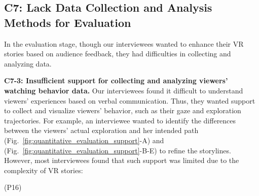 \subsection{C7: Lack Data Collection and Analysis Methods for Evaluation}

In the evaluation stage, though our interviewees wanted to enhance their VR stories based on audience feedback, they had difficulties in collecting and analyzing data.

\textbf{C7-3: Insufficient support for collecting and analyzing viewers’ watching behavior data.}
Our interviewees found it difficult to understand viewers' experiences based on verbal communication. Thus, they wanted support to collect and visualize viewers' behavior, such as their gaze and exploration trajectories. 
For example, an interviewee wanted to identify the differences between the viewers' actual exploration and her intended path (Fig.~\ref{fig:quantitative_evaluation_support}-A) and  (Fig.~\ref{fig:quantitative_evaluation_support}-B-E) to refine the storylines. However, most interviewees found that such support was limited due to the complexity of VR stories:

 (P16)


